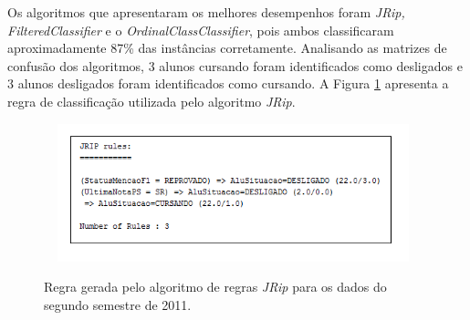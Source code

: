 Os algoritmos que apresentaram os melhores desempenhos foram  \textit{JRip, FilteredClassifier} e o \textit{OrdinalClassClassifier}, pois ambos classificaram aproximadamente 87\% das instâncias corretamente. Analisando as matrizes de confusão dos algoritmos, 3 alunos cursando foram identificados como desligados e 3 alunos desligados foram identificados como cursando. A Figura \ref{regra2_2011} apresenta a regra de classificação utilizada pelo algoritmo \textit{JRip}. 

 \begin{figure}[!h]
 	\centering
 	{\includegraphics[width=11cm, height=4cm]{images/regra2_2011}}
 	\caption {Regra gerada pelo algoritmo de regras \textit{JRip} para os dados do segundo semestre de 2011.}
 	\label{regra2_2011}
 \end{figure}